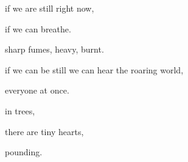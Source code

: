 \documentclass[extrafontsizes, 48pt]{memoir}
\newcommand\blankpage{%
    \null
    \thispagestyle{empty}%
    \addtocounter{page}{-1}%
    \newpage}
\begin{document}
	\begin{minipage}{.6\textwidth}
	if we are still right now,
	\end{minipage}
	\newpage

	\begin{minipage}{.6\textwidth}
	if we can breathe.
	\end{minipage}
	\newpage

	\begin{minipage}{.6\textwidth}
	sharp fumes, heavy, burnt.
	\end{minipage}
	\newpage

	\begin{minipage}{.6\textwidth}
	if we can be still we can hear the roaring world,
	\end{minipage}
	\newpage

	\begin{minipage}{.6\textwidth}
	everyone at once.
	\afterpage{\blankpage}
	\end{minipage}
	\newpage

	\begin{minipage}{.6\textwidth}
	in trees,
	\end{minipage}
	\newpage

	\begin{minipage}{.6\textwidth}
	there are tiny hearts,
	\end{minipage}
	\newpage

	\begin{minipage}{.6\textwidth}
	pounding.
	\afterpage{\blankpage}
	\end{minipage}
	\newpage
\end{document}
